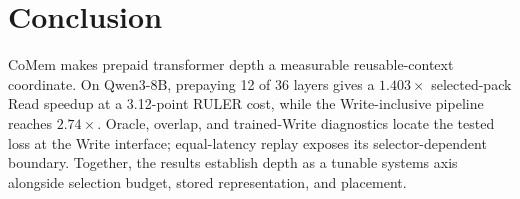 \section{Conclusion}
\label{sec:conclusion}

CoMem makes prepaid transformer depth a measurable reusable-context coordinate.
On Qwen3-8B, prepaying 12 of 36 layers gives a $1.403\times$ selected-pack Read
speedup at a 3.12-point RULER cost, while the Write-inclusive pipeline reaches
$2.74\times$. Oracle, overlap, and trained-Write diagnostics locate the tested
loss at the Write interface; equal-latency replay exposes its selector-dependent
boundary. Together, the results establish depth as a tunable systems axis
alongside selection budget, stored representation, and placement.
